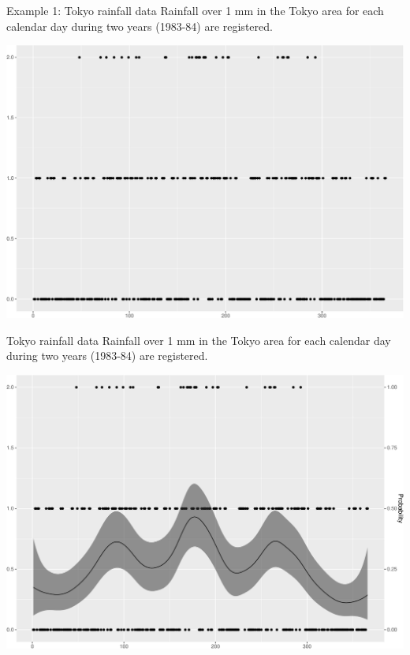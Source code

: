 \documentclass[
  ignorenonframetext,
]{beamer}
\begin{document}
\begin{frame}{Example 1: Tokyo rainfall data}
\protect\hypertarget{example-1-tokyo-rainfall-data}{}
Rainfall over 1 mm in the Tokyo area for each calendar day during two
years (1983-84) are registered.

\begin{center}\includegraphics[width=0.6\linewidth]{Part1_intro_files/figure-beamer/unnamed-chunk-8-1} \end{center}
\end{frame}

\begin{frame}{Tokyo rainfall data}
\protect\hypertarget{tokyo-rainfall-data}{}
Rainfall over 1 mm in the Tokyo area for each calendar day during two
years (1983-84) are registered.

\begin{center}\includegraphics[width=0.6\linewidth]{Part1_intro_files/figure-beamer/unnamed-chunk-9-1} \end{center}
\end{frame}
\end{document}
